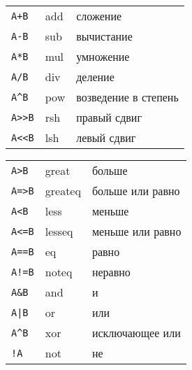 


\label{lexops}

\noindent\begin{tabular}{l l l}
\verb|A+B| & add & сложение \\
\verb|A-B| & sub & вычистание \\
\verb|A*B| & mul & умножение \\
\verb|A/B| & div & деление \\
\verb|A^B| & pow & возведение в степень \\
\verb|A>>B| & rsh & правый сдвиг \\
\verb|A<<B| & lsh & левый сдвиг \\
\hline
\end{tabular}

\noindent\begin{tabular}{l l l}
\verb|A>B| & great & больше \\
\verb|A=>B| & greateq & больше или равно \\
\verb|A<B| & less & меньше \\
\verb|A<=B| & lesseq & меньше или равно \\
\verb|A==B| & eq & равно \\
\verb|A!=B| & noteq & неравно\\
\verb|A&B| & and & и\\
\verb$A|B$ & or & или\\
\verb$A^B$ & xor & исключающее или\\
\verb$!A$ & not & не\\
\hline
\end{tabular}

